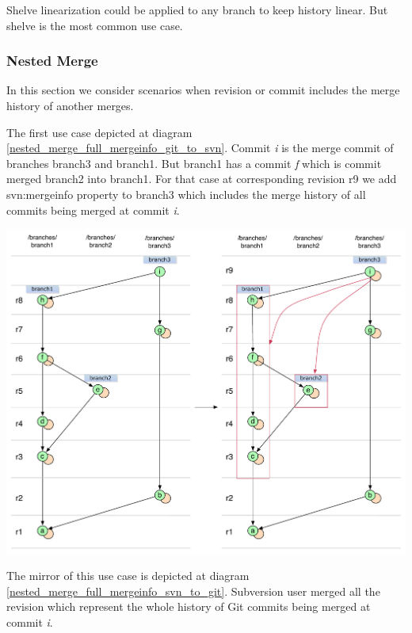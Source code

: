 Shelve linearization could be applied to any branch to keep history linear. But shelve is the most common use case.

\subsubsection{Nested Merge}

In this section we consider scenarios when revision or commit includes the merge history of another merges.

The first use case depicted at diagram \ref{nested_merge_full_mergeinfo_git_to_svn}. Commit \emph{i} is the merge commit of branches branch3 and branch1. But branch1 has a commit \emph{f} which is commit merged branch2 into branch1. For that case at corresponding revision r9 we add svn:mergeinfo property to branch3 which includes the merge history of all commits being merged at commit \emph{i}.

\begin{center}
\includegraphics[width=\textwidth]{img/diagrams/nested_merge_full_mergeinfo_git_to_svn.pdf}%
\label{nested_merge_full_mergeinfo_git_to_svn}%
\end{center}

The mirror of this use case is depicted at diagram \ref{nested_merge_full_mergeinfo_svn_to_git}. Subversion user merged all the revision which represent the whole history of Git commits being merged at commit \emph{i}.

